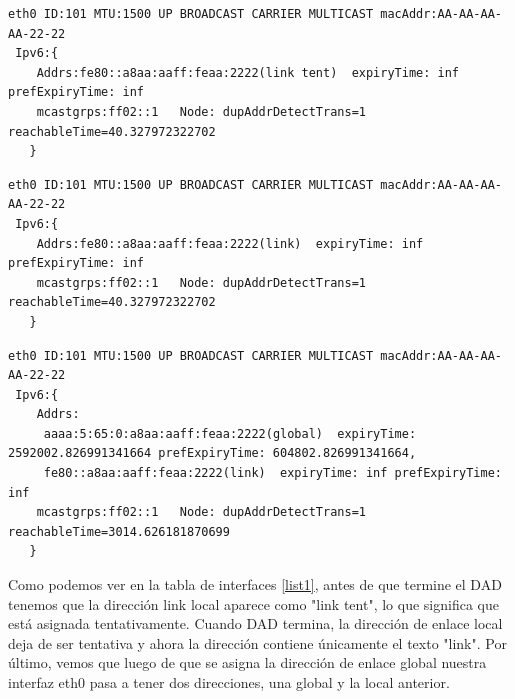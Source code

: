 \begin{flushleft}
\begin{lstlisting}[caption={Antes del DADTimeout y de obtener la dirección global}, label={list1}]
eth0 ID:101 MTU:1500 UP BROADCAST CARRIER MULTICAST macAddr:AA-AA-AA-AA-22-22 
 Ipv6:{
	Addrs:fe80::a8aa:aaff:feaa:2222(link tent)  expiryTime: inf prefExpiryTime: inf
	mcastgrps:ff02::1 	Node: dupAddrDetectTrans=1 reachableTime=40.327972322702
   }
\end{lstlisting}
\begin{lstlisting}[caption={Después del DADTimeout y antes de obtener la dirección global}, label={list2}]
eth0 ID:101 MTU:1500 UP BROADCAST CARRIER MULTICAST macAddr:AA-AA-AA-AA-22-22 
 Ipv6:{
	Addrs:fe80::a8aa:aaff:feaa:2222(link)  expiryTime: inf prefExpiryTime: inf
	mcastgrps:ff02::1 	Node: dupAddrDetectTrans=1 reachableTime=40.327972322702
   }
\end{lstlisting}

\begin{lstlisting}[caption={Después de obtener la dirección global}]
eth0 ID:101 MTU:1500 UP BROADCAST CARRIER MULTICAST macAddr:AA-AA-AA-AA-22-22 
 Ipv6:{
	Addrs:
     aaaa:5:65:0:a8aa:aaff:feaa:2222(global)  expiryTime: 2592002.826991341664 prefExpiryTime: 604802.826991341664,
     fe80::a8aa:aaff:feaa:2222(link)  expiryTime: inf prefExpiryTime: inf
	mcastgrps:ff02::1 	Node: dupAddrDetectTrans=1 reachableTime=3014.626181870699
   }
\end{lstlisting}

Como podemos ver en la tabla de interfaces \ref{list1}, antes de que termine el DAD tenemos que la dirección link local aparece como "link tent", lo que significa que está asignada tentativamente. Cuando DAD termina, la dirección de enlace local deja de ser tentativa y ahora la dirección contiene únicamente el texto "link". Por último, vemos que luego de que se asigna la dirección de enlace global nuestra interfaz eth0 pasa a tener dos direcciones, una global y la local anterior.
\end{flushleft}

